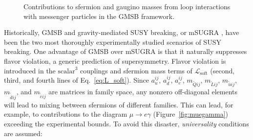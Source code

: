 \documentclass[dissertation.tex]{subfiles}
\begin{document}
\begin{figure}
	\caption{Contributions to sfermion and gaugino masses from loop interactions with messenger particles in the GMSB framework.}
	\label{fig:gaugino_sfermion_GMSB_mass_terms}
\end{figure}

Historically, GMSB and gravity-mediated SUSY breaking, or mSUGRA \cite{PhysRevLett.49.970,Barbieri1982343,Ibanez198273,PhysRevD.27.2359,PTP.70.542,Ellis1983123,AlvarezGaume1983495}, have been the two most thoroughly experimentally studied scenarios of SUSY breaking.  One advantage of GMSB over mSUGRA is that it naturally suppresses flavor violation, a generic prediction of supersymmetry.  Flavor violation is introduced in the $\mbox{scalar}^{3}$ couplings and sfermion mass terms of $\mathcal{L}_{\mathrm{soft}}$ (second, third, and fourth lines of Eq.~\ref{eq:L_soft}).  Since $a_{u}^{ij}$, $a_{d}^{ij}$, $a_{e}^{ij}$, $m_{\widetilde{Q}ij}$, $m_{\widetilde{L}ij}$, $m_{\widetilde{\overline{u}}ij}$, $m_{\widetilde{\overline{d}}ij}$, and $m_{\widetilde{\overline{e}}ij}$ are matrices in family space, any nonzero off-diagonal elements will lead to mixing between sfermions of different families.  This can lead, for example, to contributions to the diagram $\mu\rightarrow e\gamma$ (Figure~\ref{fig:muegamma}) exceeding the experimental bounds.  To avoid this disaster, \textit{universality} conditions are assumed:
\end{document}
